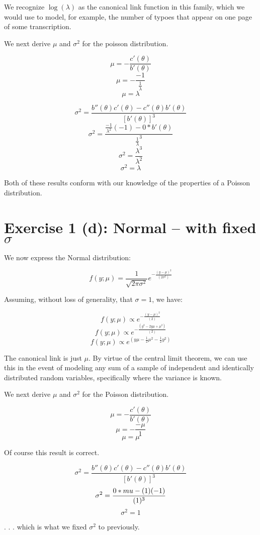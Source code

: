 \documentclass[12pt,a4paper]{article}
\begin{document}
We recognize $\log(\lambda)$ as the canonical link function in this family, which we would use to model, for example, the number of typoes that appear on one page of some transcription.

\newpage

We next derive $\mu$ and $\sigma^{2}$ for the poisson distribution.

$$\mu = - \frac{c'(\theta)}{b'(\theta)}$$
$$\mu = - \frac{-1}{\frac{1}{\lambda}}$$
$$\mu = \lambda$$

$$\sigma^{2} = \frac{b''(\theta)c'(\theta) - c''(\theta)b'(\theta)}{[b'(\theta)]^{3}}$$
$$\sigma^{2} = \frac{\frac{-1}{\lambda^{2}} (-1) - 0*b'(\theta)}{\frac{1}{\lambda}^{3}}$$
$$\sigma^{2} = \frac{\lambda^{3}}{\lambda^{2}}$$
$$\sigma^{2} = \lambda$$

Both of these results conform with our knowledge of the properties of a Poisson distribution.

\newpage

\section{Exercise 1 (d): Normal -- with fixed $\sigma$}

We now express the Normal distribution: 

$$f(y;\mu) = \frac{1}{\sqrt{2 \pi \sigma^{2}}} e^{- \frac{(y-\mu)^{2}}{(2\sigma^{2})}}$$

Assuming, without loss of generality, that $\sigma = 1$, we have: 

$$f(y;\mu) \propto e^{- \frac{(y-\mu)^{2}}{(2)}}$$
$$f(y;\mu) \propto e^{- \frac{(y^2-2y\mu+\mu^2)}{(2)}}$$
$$f(y;\mu) \propto e^{(y\mu - \frac{1}{2}\mu^2 - \frac{1}{2}y^2)}$$

The canonical link is just $\mu$. By virtue of the central limit theorem, we can use this in the event of modeling any sum of a sample of independent and identically distributed random variables, specifically where the variance is known. 
\newpage

We next derive $\mu$ and $\sigma^{2}$ for the Poisson distribution.

$$\mu = - \frac{c'(\theta)}{b'(\theta)}$$
$$\mu = - \frac{-\mu}{1}$$
$$\mu = \mu$$

Of course this result is correct. 

$$\sigma^{2} = \frac{b''(\theta)c'(\theta) - c''(\theta)b'(\theta)}{[b'(\theta)]^{3}}$$
$$\sigma^{2} = \frac{0*\-mu - (1)(-1)}{(1)^{3}}$$
$$\sigma^{2} = 1$$

. . . which is what we fixed $\sigma^{2}$ to previously.
\end{document}
